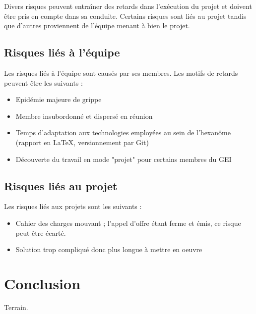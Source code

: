 \documentclass[twoside]{article}
\begin{document}
Divers risques peuvent entraîner des retards dans l'exécution du projet et
doivent être pris en compte dans sa conduite. Certains risques sont liés au
projet tandis que d'autres proviennent de l'équipe menant à bien le projet.

\subsection{Risques liés à l'équipe}

Les risques liés à l'équipe sont causés par ses membres. Les motifs de
retards peuvent être les suivants :

\begin{itemize}

\item Epidémie majeure de grippe
\item Membre insubordonné et dispersé en réunion
\item Temps d'adaptation aux technologies employées au sein de l'hexanôme
(rapport en \LaTeX, versionnement par Git)
\item Découverte du travail en mode "projet" pour certains membres du GEI

\end{itemize}


\subsection{Risques liés au projet}

Les risques liés aux projets sont les suivants :

\begin{itemize}

\item Cahier des charges mouvant ; l'appel d'offre étant ferme et émis, ce
risque peut être écarté.
\item Solution trop compliqué donc plus longue à mettre en oeuvre

\end{itemize}

\pagebreak


\section{Conclusion}

Terrain.



\end{document}
